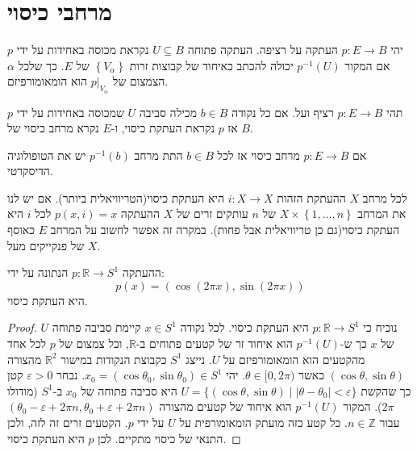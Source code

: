 \documentclass{tstextbook}
\begin{document}
\section{מרחבי כיסוי}

\begin{definition}
יהי \(p:E\to B\) העתקה על רציפה. העתקה פתוחה \(U\subseteq B\) נקראת מכוסה באחידות על ידי \(p\) אם המקור \(p ^{-1}(U)\) יכולה להכתב כאיחוד של קבוצות זרות \(\left\{  V_{\alpha}  \right\}\) של \(E\). כך שלכל \(\alpha\) הצמצום של \(p|_{V_{\alpha}}\) הוא הומאומורפיזם.

\end{definition}
\begin{definition}
תהי \(p:E\to B\) רציף ועל. אם כל נקודה \(b \in B\) מכילה סביבה \(U\) שמכוסה באחידות על ידי \(p\) אז \(p\) נקראת העתקת כיסוי, ו-\(E\) נקרא מרחב כיסוי של \(B\).

\end{definition}
\begin{remark}
אם \(p:E\to B\) מרחב כיסוי אז לכל \(b \in B\) התת מרחב \(p ^{-1}(b)\) יש את הטופולוגיה הדיסקרטי.

\end{remark}
\begin{example}
לכל מרחב \(X\) ההעתקת הזהות \(i:X\to X\) היא העתקת כיסוי(הטריוויאלית ביותר). אם יש לנו את המרחב \(X\times \left\{  1,\dots,n \right\}\) של \(n\) עותקים זרים של \(X\) ההעתקה \(p(x,i)=x\) לכל \(i\) היא העתקת כיסוי(גם כן טריוויאלית אבל פחות). במקרה זה אפשר לחשוב על המרחב \(E\) כאוסף של פנקייקים מעל \(X\).

\end{example}
\begin{example}
ההעתקה \(p:\mathbb{R}\to S^{1}\) הנתונה על ידי:
$$p(x)=\left( \cos\left( 2\pi x \right),\sin\left( 2\pi x \right) \right)$$
היא העתקת כיסוי.

\end{example}
\begin{proof}
נוכיח כי \(p:\mathbb{R}\to S^{1}\) היא העתקת כיסוי. לכל נקודה \(x\in S^{1}\) קיימת סביבה פתוחה \(U\) של \(x\) כך ש-\(p^{-1}(U)\) הוא איחוד זר של קטעים פתוחים ב-\(\mathbb{R}\), וכל צמצום של \(p\) לכל אחד מהקטעים הוא הומאומורפיזם על \(U\).
נייצג \(S^{1}\) כקבוצת הנקודות במישור \(\mathbb{R}^{2}\) מהצורה \((\cos\theta,\sin\theta)\) כאשר \(\theta\in[0,2\pi)\). יהי \(x_{0}=(\cos\theta_{0},\sin\theta_{0})\in S^{1}\). נבחר \(\varepsilon>0\) קטן כך שהקשת \(U=\{(\cos\theta,\sin\theta)\mid |\theta-\theta_{0}|<\varepsilon\}\) היא סביבה פתוחה של \(x_{0}\) ב-\(S^{1}\) (מודולו \(2\pi\)).
המקור \(p^{-1}(U)\) הוא איחוד של קטעים מהצורה \((\theta_{0}-\varepsilon+2\pi n,\theta_{0}+\varepsilon+2\pi n)\) עבור \(n\in\mathbb{Z}\). כל קטע כזה מועתק הומאומורפית על \(U\) על ידי \(p\). הקטעים זרים זה לזה, ולכן התנאי של כיסוי מתקיים.
לכן \(p\) היא העתקת כיסוי.

\end{proof}
\end{document}
